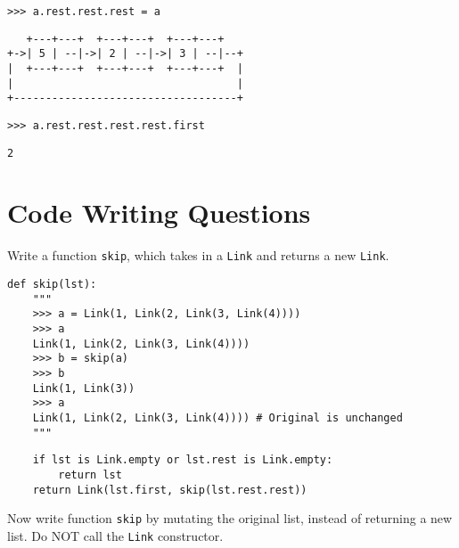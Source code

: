 \documentclass{exam}
\begin{document}
\begin{questions}
\begin{blocksection}
\begin{lstlisting}
>>> a.rest.rest.rest = a
\end{lstlisting}
\begin{solution}[0in]
\begin{lstlisting}
   +---+---+  +---+---+  +---+---+
+->| 5 | --|->| 2 | --|->| 3 | --|--+
|  +---+---+  +---+---+  +---+---+  |
|                                   |
+-----------------------------------+
\end{lstlisting}
\end{solution}

\begin{lstlisting}
>>> a.rest.rest.rest.rest.first
\end{lstlisting}
\begin{solution}[.25in]
\begin{lstlisting}
2
\end{lstlisting}
\end{solution}

\end{blocksection}

\section{Code Writing Questions}

\begin{blocksection}
\question Write a function \texttt{skip}, which takes in a \texttt{Link} and returns a new \texttt{Link}.

\begin{lstlisting}
def skip(lst):
    """
    >>> a = Link(1, Link(2, Link(3, Link(4))))
    >>> a
    Link(1, Link(2, Link(3, Link(4))))
    >>> b = skip(a)
    >>> b
    Link(1, Link(3))
    >>> a
    Link(1, Link(2, Link(3, Link(4)))) # Original is unchanged
    """
\end{lstlisting}
\begin{solution}[1in]
\begin{lstlisting}
    if lst is Link.empty or lst.rest is Link.empty:
        return lst
    return Link(lst.first, skip(lst.rest.rest))
\end{lstlisting}
\end{solution}
\end{blocksection}


\begin{blocksection}
\question Now write function \texttt{skip} by mutating the original list, instead of returning a new list. Do NOT call the \texttt{Link} constructor.


\end{blocksection}
\end{questions}
\end{document}
